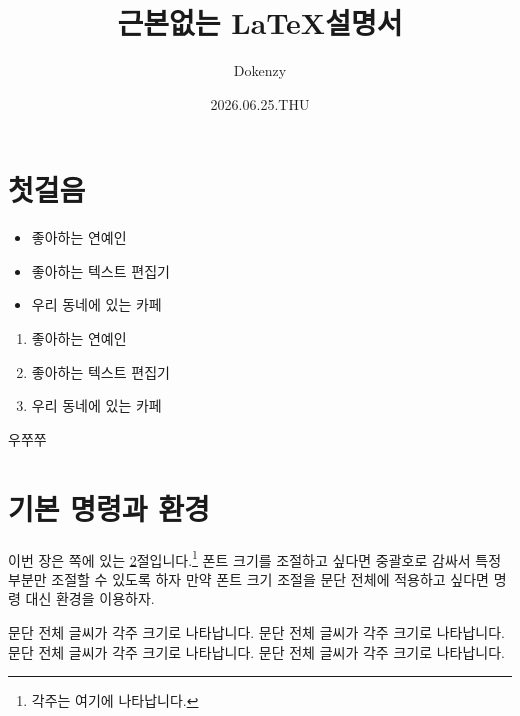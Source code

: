 \documentclass{article}
\title{근본없는 \LaTeX 설명서}
\author{Dokenzy}
\date{2026.06.25.THU}
\begin{document}
\maketitle        %
\tableofcontents  %

\section{첫걸음}
\begin{itemize}   %
\item 좋아하는 연예인
\item[-] 좋아하는 텍스트 편집기
\item 우리 동네에 있는 카페 
\end{itemize}

\begin{enumerate} %
\item 좋아하는 연예인
\item 좋아하는 텍스트 편집기
\item 우리 동네에 있는 카페
\end{enumerate}

우쭈쭈 %

\section{기본 명령과 환경} %
\label{hello}
이번 장은 \pageref{hello}쪽에 있는 
\ref{hello}절입니다.\footnote{각주는 여기에 나타납니다.}  %
폰트 크기를 조절하고 싶다면 중괄호로 감싸서 {\tiny 특정 부분만 조절할 수 있도록} 하자
만약 폰트 크기 조절을 문단 전체에 적용하고 싶다면 명령 대신 환경을 이용하자.

\begin{footnotesize}
문단 전체 글씨가 각주 크기로 나타납니다.
문단 전체 글씨가 각주 크기로 나타납니다.
문단 전체 글씨가 각주 크기로 나타납니다.
문단 전체 글씨가 각주 크기로 나타납니다. 
\end{footnotesize}
\end{document}
